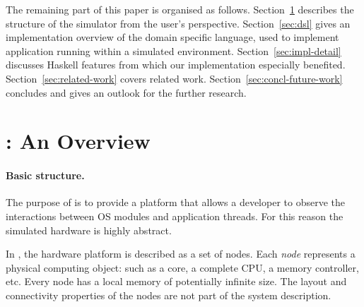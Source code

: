 The remaining part of this paper is organised as follows.
Section~\ref{sec:soosim-an-overview} describes the structure of the \soosim simulator from the user's perspective.
Section~\ref{sec:dsl} gives an implementation overview of the domain specific language, used to implement application running within a \soosim simulated environment.
Section~\ref{sec:impl-detail} discusses Haskell features from which our implementation especially benefited.
Section~\ref{sec:related-work} covers related work.
Section~\ref{sec:concl-future-work} concludes and gives an outlook for the further research.

%

\section{\soosim: An Overview}
\label{sec:soosim-an-overview}

\paragraph{Basic structure.}
The purpose of \soosim is to provide a platform that allows a developer to observe the interactions between OS modules and application threads.
For this reason the simulated hardware is highly abstract.

In \soosim, the hardware platform is described as a set of nodes.
Each \emph{node} represents a physical computing object: such as a core, a complete CPU, a memory controller, etc.
Every node has a local memory of potentially infinite size.
The layout and connectivity properties of the nodes are not part of the system description.

